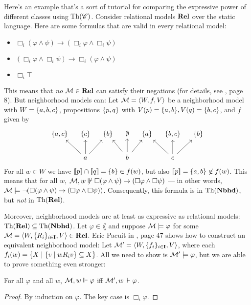 \documentclass[letterpaper]{article}
\begin{document}
\begin{example*}
    Here's an example that's a sort of tutorial for comparing the expressive power of different classes using $\mathrm{Th}( \mathscr{C} )$.  Consider relational models $\textrm{\textbf{Rel}}$ over the static language.  Here are some formulas that are valid in every relational model:
    \begin{itemize}
        \item $\Box_i(\varphi \land \psi) \to (\Box_i \varphi \land \Box_i \psi)$
        \item $(\Box_i \varphi \land \Box_i \psi) \to \Box_i(\varphi \land \psi)$
        \item $\Box_i \top$
    \end{itemize}
    This means that \emph{no} $\mathcal{M} \in \textrm{\textbf{Rel}}$ can satisfy their negations (for details, see \cite{pacuit2017neighborhood}, page 8).  But neighborhood models can: Let $\mathcal{M} = \langle W, f, V \rangle$ be a neighborhood model with $W = \{ a, b, c \}$, propositions $\{ p, q \}$ with $V(p) = \{ a, b \}, V(q) = \{ b, c \}$, and $f$ given by
    \[
    \begin{tikzcd}[column sep=1em]
        \set{a, c} & \set{c} & \set{b} & \emptyset & \set{a} & \set{b,c} & \set{b} \\
           &  a \arrow{lu} \arrow{u} \arrow{ru}  &     &  b \arrow{lu} \arrow{u} \arrow{ru}  &    &  c \arrow{lu} \arrow{u} \arrow{ru} &
    \end{tikzcd}
    \]
    For all $w \in W$ we have $[\![\mbox{\em $ p $\/}]\!] \cap [\![\mbox{\em $ q $\/}]\!] = \{ b \} \in f(w)$, but also $[\![\mbox{\em $ p $\/}]\!] = \{ a, b \} \not \in f(w)$. This means that for all $w$, $\mathcal{M}, w \not \Vdash \Box(\varphi \land \psi) \to (\Box \varphi \land \Box \psi)$ --- in other words, $\mathcal{M} \models \neg (\Box(\varphi \land \psi) \to (\Box \varphi \land \Box \psi))$.  Consequently, this formula is in $\mathrm{Th}( \textrm{\textbf{Nbhd}} )$, but \emph{not} in $\mathrm{Th}( \textrm{\textbf{Rel}} )$.
    
    Moreover, neighborhood models are at least as expressive as relational models: $\mathrm{Th}( \textrm{\textbf{Rel}} ) \subseteq \mathrm{Th}( \textrm{\textbf{Nbhd}} )$.  Let $\varphi \in \lang$ and suppose $\mathcal{M} \models \varphi$ for some $\mathcal{M} = \langle W, \{ R_i \}_{i \in \textbf{I}}, V \rangle \in \textrm{\textbf{Rel}}$.  Eric Pacuit in \cite{pacuit2017neighborhood}, page 47 shows how to construct an equivalent neighborhood model:  Let $\mathcal{M}' = \langle W, \{ f_i \}_{i \in \textbf{I}}, V \rangle$, where each $f_i(w) = \{ X \mid \{ v \mid w{R_i}v  \} \subseteq X \}$.  All we need to show is $\mathcal{M}' \models \varphi$, but we are able to prove something even stronger:
    \begin{proposition}
        For all $\varphi$ and all $w$, $\mathcal{M}, w \Vdash \varphi$ iff $\mathcal{M}', w \Vdash \varphi$.
    \end{proposition}
    \begin{proof}
        By induction on $\varphi$.  The key case is $\Box_i \varphi$.  
        

\end{proof}
\end{example*}
\end{document}
